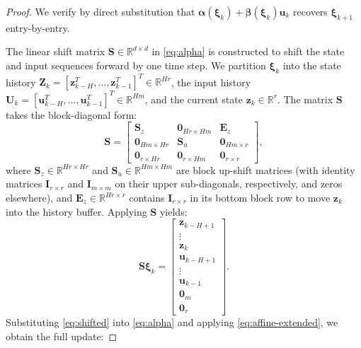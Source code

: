 \documentclass{article}
\begin{document}
\begin{proof}
We verify by direct substitution that $\boldsymbol{\alpha}(\boldsymbol{\xi}_k)+\boldsymbol{\beta}(\boldsymbol{\xi}_k)\mathbf{u}_k$ recovers $\boldsymbol{\xi}_{k+1}$ entry-by-entry.

The linear shift matrix $\mathbf{S} \in \mathbb{R}^{d \times d}$ in \eqref{eq:alpha} is constructed to shift the state and input sequences forward by one time step.
We partition $\boldsymbol{\xi}_k$ into the state history $\mathbf{Z}_{k} = [\mathbf{z}^T_{k-H}, \dots, \mathbf{z}^T_{k-1}]^T \in \mathbb{R}^{Hr}$, the input history $\mathbf{U}_{k} = [\mathbf{u}^T_{k-H}, \dots, \mathbf{u}^T_{k-1}]^T \in \mathbb{R}^{Hm}$, and the current state $\mathbf{z}_k \in \mathbb{R}^r$. The matrix $\mathbf{S}$ takes the block-diagonal form:
\begin{equation*}
\mathbf{S} = \begin{bmatrix}
\mathbf{S}_z & \mathbf{0}_{Hr \times Hm} & \mathbf{E}_z \\
\mathbf{0}_{Hm \times Hr} & \mathbf{S}_u & \mathbf{0}_{Hm \times r} \\
\mathbf{0}_{r \times Hr} & \mathbf{0}_{r \times Hm} & \mathbf{0}_{r \times r}
\end{bmatrix},
\end{equation*}
where $\mathbf{S}_z \in \mathbb{R}^{Hr \times Hr}$ and $\mathbf{S}_u \in \mathbb{R}^{Hm \times Hm}$ are block up-shift matrices (with identity matrices $\mathbf{I}_{r\times r}$ and $\mathbf{I}_{m \times m}$ on their upper sub-diagonals, respectively, and zeros elsewhere), and $\mathbf{E}_z \in \mathbb{R}^{Hr \times r}$ contains $\mathbf{I}_{r \times r}$ in its bottom block row to move $\mathbf{z}_k$ into the history buffer. Applying $\mathbf{S}$ yields:
\begin{equation}
\label{eq:shifted}
\mathbf{S} \boldsymbol{\xi}_k = \begin{bmatrix} \mathbf{z}_{k-H+1} \\ \vdots \\ \mathbf{z}_{k} \\ \mathbf{u}_{k-H+1} \\ \vdots \\ \mathbf{u}_{k-1} \\ \mathbf{0}_{m} \\ \mathbf{0}_{r} \end{bmatrix}.
\end{equation}
Substituting \eqref{eq:shifted} into \eqref{eq:alpha} and applying \eqref{eq:affine-extended}, we obtain the full update:

\end{proof}
\end{document}
